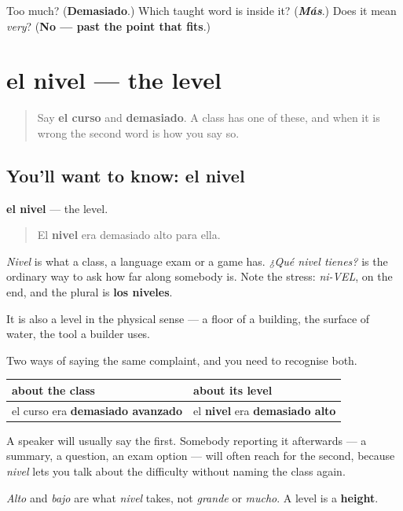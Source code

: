 \begin{tcolorbox}[breakable,colback=teal!4,colframe=teal!35!black,title={Before you move on}]
Too much? (\textbf{Demasiado}.) Which taught word is inside it? (\emph{\textbf{Más}}.) Does it mean \emph{very}? (\textbf{No — past the point that fits}.)
\end{tcolorbox}
\section[el nivel]{el nivel — the level}

\label{lesson:ES-C471-nivel}



\begin{quote}
Say \textbf{el curso} and \textbf{demasiado}. A class has one of these, and when it is wrong the second word is how you say so.
\end{quote}

\subsection*{You'll want to know: el nivel}
\textbf{el nivel} — the level.

\begin{quote}
El \textbf{nivel} era demasiado alto para ella.
\end{quote}

\emph{Nivel} is what a class, a language exam or a game has. \emph{¿Qué nivel tienes?} is the ordinary way to ask how far along somebody is. Note the stress: \emph{ni-VEL}, on the end, and the plural is \textbf{los niveles}.

It is also a level in the physical sense — a floor of a building, the surface of water, the tool a builder uses.

\begin{grammarlens}[title={Grammar Lens: the phrase the question will use}]
Two ways of saying the same complaint, and you need to recognise both.

\noindent
\begin{tabularx}{\linewidth}{@{}>{\raggedright\arraybackslash}X>{\raggedright\arraybackslash}X@{}}
\toprule
\textbf{about the class} & \textbf{about its level} \\
\midrule
el curso era \textbf{demasiado avanzado} & el \textbf{nivel} era \textbf{demasiado alto} \\
\bottomrule
\end{tabularx}

A speaker will usually say the first. Somebody reporting it afterwards — a summary, a question, an exam option — will often reach for the second, because \emph{nivel} lets you talk about the difficulty without naming the class again.

\emph{Alto} and \emph{bajo} are what \emph{nivel} takes, not \emph{grande} or \emph{mucho}. A level is a \textbf{height}.
\end{grammarlens}


